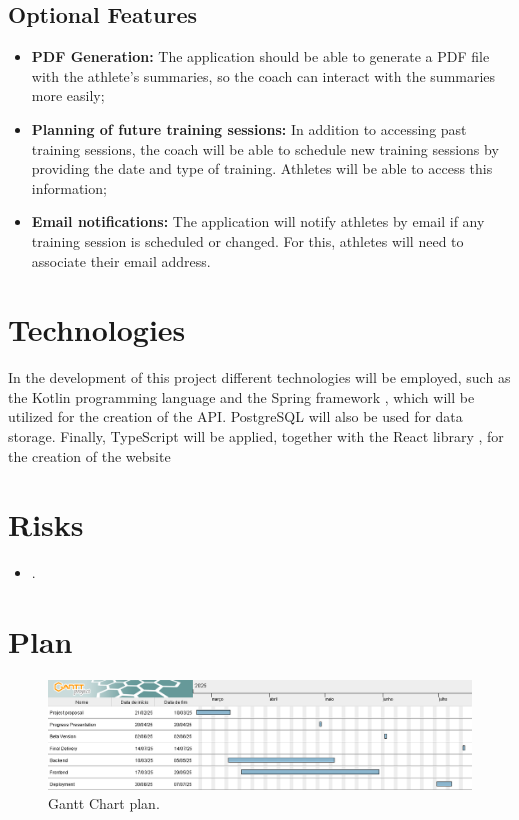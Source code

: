 \documentclass[a4paper,twoside,11pt]{article}
\begin{document}
\subsection{Optional Features}
\begin{itemize}
\item \textbf{PDF Generation:} The application should be able to generate a PDF file with the athlete's summaries, so the coach can interact with the summaries more easily;
\item \textbf{Planning of future training sessions:} In addition to accessing past training sessions, the coach will be able to schedule new training sessions by providing the date and type of training. Athletes will be able to access this information;
\item \textbf{Email notifications:} The application will notify athletes by email if any training session is scheduled or changed. For this, athletes will need to associate their email address.
\end{itemize}

\section{Technologies}
In the development of this project different technologies will be employed, such as the Kotlin programming language \cite{kotlin} and the Spring framework \cite{spring}, which will be utilized for the creation of the API. PostgreSQL \cite{postgresql} will also be used for data storage. Finally, TypeScript \cite{typescript} will be applied, together with the React library \cite{react}, for the creation of the website

\section{Risks}
\begin{itemize}
\item .
\end{itemize}

\section{Plan}
\begin{figure}[h]
\centering
\includegraphics [width=6in]{GanttChart.png}
\caption{Gantt Chart plan.}
\end{figure}



\end{document}
